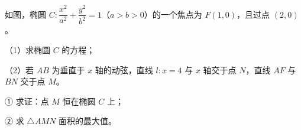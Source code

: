 \begin{question}
如图，椭圆 $C:\dfrac{x^2}{a^2}+\dfrac{y^2}{b^2}=1$（$a>b>0$）的一个焦点为 $F(1,0)$，且过点 $(2,0)$。

（1）求椭圆 $C$ 的方程；

（2）若 $AB$ 为垂直于 $x$ 轴的动弦，直线 $l:x=4$ 与 $x$ 轴交于点 $N$，直线 $AF$ 与 $BN$ 交于点 $M$。

① 求证：点 $M$ 恒在椭圆 $C$ 上；

② 求 $\triangle AMN$ 面积的最大值。
\nopagebreak[4]
\begin{center}\end{center}
\nopagebreak[4]

\end{question}